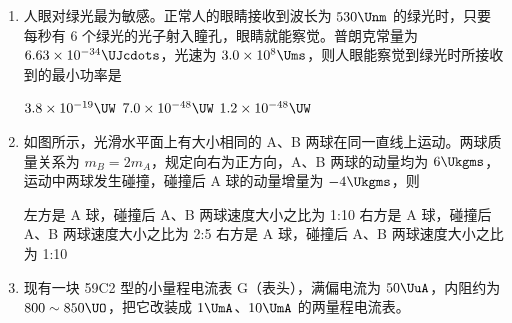 \documentclass[\gkver]{gaokaozhenti}
\begin{document}
\begin{enumerate}
{$v = \frac{l\lambda}{\Delta x\Delta t}$}
{$v = \frac{l\Delta x}{\lambda \Delta t}$}
{$v = \frac{l\Delta t}{\lambda \Delta x}$}

\item
人眼对绿光最为敏感。正常人的眼睛接收到波长为 $530\Unm$ 的绿光时，只要每秒有 6 个绿光的光子射入瞳孔，眼睛就能察觉。普朗克常量为 $6.63\times10^{-34}\UJcdots$，光速为 $3.0\times10^{8}\Ums$，则人眼能察觉到绿光时所接收到的最小功率是

{$3.8\times10^{-19}\UW$}
{$7.0\times10^{-48}\UW$}
{$1.2\times10^{-48}\UW$}

\item
如图所示，光滑水平面上有大小相同的 A、B 两球在同一直线上运动。两球质量关系为 $m_{B} = 2m_{A}$，规定向右为正方向，A、B 两球的动量均为 $6\Ukgms$，运动中两球发生碰撞，碰撞后 A 球的动量增量为 $-4\Ukgms$，则

\onepicture[w=3.73cm]{}
{左方是 A 球，碰撞后 A、B 两球速度大小之比为 1:10}
{右方是 A 球，碰撞后 A、B 两球速度大小之比为 2:5}
{右方是 A 球，碰撞后 A、B 两球速度大小之比为 1:10}

\item
现有一块 59C2 型的小量程电流表 G（表头），满偏电流为 $50\UuA$，内阻约为 $800\sim850\UO$，把它改装成 $1\UmA$、$10\UmA$ 的两量程电流表。


\end{enumerate}
\end{document}

